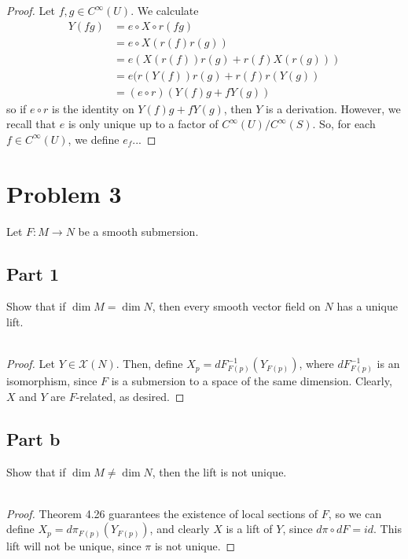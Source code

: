 \documentclass[fontsize=11pt]{scrartcl} %
\numberwithin{equation}{section} %
\numberwithin{figure}{section} %
\numberwithin{table}{section} %
\begin{document}
\begin{proof}
    Let $f,g\in
    C^{\infty}(U)$. We calculate
    \[
        \begin{aligned}
            Y(fg) &= e\circ X\circ r(fg)\\
                    &= e\circ X(r(f)r(g))\\
                    &= e(X(r(f))r(g) + r(f)X(r(g)))\\
                    &= e(r(Y(f))r(g) +r(f)r(Y(g))\\
                    &= (e\circ r)(Y(f)g + fY(g))
        \end{aligned}
    \]
    so if $e\circ r$ is the identity on $Y(f)g + fY(g)$, then $Y$ is a
    derivation. However, we recall that $e$ is only unique up to a factor of
    $C^{\infty}(U)/{C^{\infty}(S)}$. So, for each $f\in C^{\infty}(U)$, we
    define $e_f$... %
\end{proof}

\section*{Problem 3} %
Let $F:M\to N$ be a smooth submersion.
\subsection*{Part 1}
Show that if $\dim M = \dim N$, then every smooth vector field on $N$ has a
unique lift.
\\
\\
\begin{proof}
    Let $Y\in \mathcal{X}(N)$. Then, define $X_p = dF^{-1}_{F(p)}(Y_{F(p)})$, where
    $dF^{-1}_{F(p)}$ is an isomorphism, since $F$ is a submersion to a space of
    the same dimension. Clearly, $X$ and $Y$ are $F$-related, as desired.
\end{proof}

\subsection*{Part b}
Show that if $\dim M \neq \dim N$, then the lift is not unique.
\\
\\
\begin{proof}
    Theorem 4.26 guarantees the existence of local sections of $F$, so we can
    define $X_p = d\pi_{F(p)}(Y_{F(p)})$, and clearly $X$ is a lift of $Y$,
    since $d\pi\circ dF = id$. This lift will not be unique, since $\pi$ is not
    unique.
\end{proof}
\end{document}
